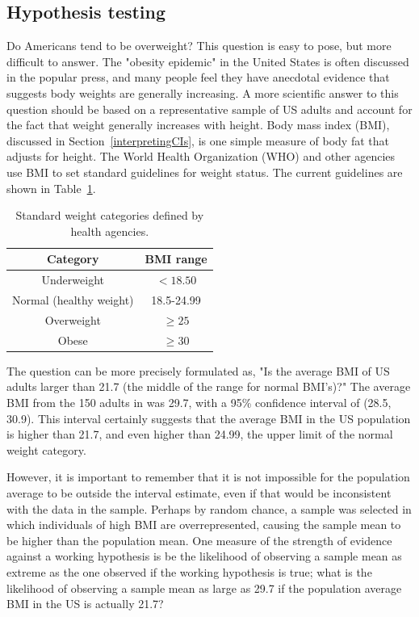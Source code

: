 \begin{spacing}{1.5}
\section[Hypothesis testing]{Hypothesis testing} %
\label{hypothesisTesting}


Do Americans tend to be overweight? This question is easy to pose, but more difficult to answer. The "obesity epidemic" in the United States is often discussed in the popular press, and many people feel they have anecdotal evidence that suggests body weights are generally increasing. A more scientific answer to this question should be based on a representative sample of US adults and account for the fact that weight generally increases with height. Body mass index (BMI), discussed in Section~\ref{interpretingCIs}, is one simple measure of body fat that adjusts for height. The World Health Organization (WHO) and other agencies use BMI to set standard guidelines for weight status. The current guidelines are shown in Table~\ref{whoBmiGuidelines}. 


\begin{table}[h!]
\begin{center}
\begin{tabular}{|c|c|}
\hline 
Category & BMI range\tabularnewline
\hline 
\hline 
Underweight & $<18.50$\tabularnewline
\hline 
Normal (healthy weight) & 18.5-24.99\tabularnewline
\hline 
Overweight & $\geq 25$\tabularnewline
\hline 
Obese & $\geq30$\tabularnewline
\hline
\end{tabular}
\caption{Standard weight categories defined by health agencies.} 
\label{whoBmiGuidelines}
\end{center}
\end{table}

The question can be more precisely formulated as, "Is the average BMI of US adults larger than 21.7 (the middle of the range for normal BMI's)?" The average BMI from the 150 adults in  was 29.7, with a 95\% confidence interval of (28.5, 30.9). This interval certainly suggests that the average BMI in the US population is higher than 21.7, and even higher than 24.99, the upper limit of the normal weight category. 

However, it is important to remember that it is not impossible for the population average to be outside the interval estimate, even if that would be inconsistent with the data in the sample. Perhaps by random chance, a sample was selected in which individuals of high BMI are overrepresented, causing the sample mean to be higher than the population mean. One measure of the strength of evidence against a working hypothesis is be the likelihood of observing a sample mean as extreme as the one observed if the working hypothesis is true; what is the likelihood of observing a sample mean as large as 29.7 if the population average BMI in the US is actually 21.7?


\end{spacing}
